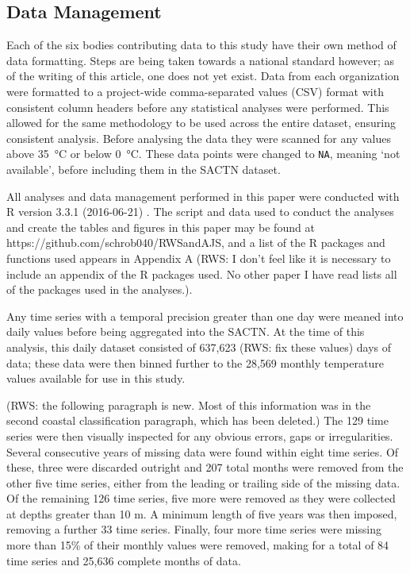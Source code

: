 \documentclass{ametsoc}
\begin{document}
\subsection{Data Management}
Each of the six bodies contributing data to this study have their own method of data formatting. Steps are being taken towards a national standard however; as of the writing of this article, one does not yet exist. Data from each organization were formatted to a project-wide comma-separated values (CSV) format with consistent column headers before any statistical analyses were performed. This allowed for the same methodology to be used across the entire dataset, ensuring consistent analysis. Before analysing the data they were scanned for any values above \SI{35}{\degreeCelsius} or below \SI{0}{\degreeCelsius}. These data points were changed to \texttt{NA}, meaning `not available', before including them in the SACTN dataset.

All analyses and data management performed in this paper were conducted with R version 3.3.1 (2016-06-21) \citep{R}. The script and data used to conduct the analyses and create the tables and figures in this paper may be found at https://github.com/schrob040/RWSandAJS, and a list of the R packages and functions used appears in Appendix A (RWS: I don't feel like it is necessary to include an appendix of the R packages used. No other paper I have read lists all of the packages used in the analyses.).

Any time series with a temporal precision greater than one day were meaned into daily values before being aggregated into the SACTN. At the time of this analysis, this daily dataset consisted of 637,623 (RWS: fix these values) days of data; these data were then binned further to the 28,569 monthly temperature values available for use in this study.

(RWS: the following paragraph is new. Most of this information was in the second coastal classification paragraph, which has been deleted.)
The 129 time series were then visually inspected for any obvious errors, gaps or irregularities. Several consecutive years of missing data were found within eight time series. Of these, three were discarded outright and 207 total months were removed from the other five time series, either from the leading or trailing side of the missing data. Of the remaining 126 time series, five more were removed as they were collected at depths greater than 10 m. A minimum length of five years was then imposed, removing a further 33 time series. Finally, four more time series were missing more than 15\% of their monthly values were removed, making for a total of 84 time series and 25,636 complete months of data.
\end{document}
